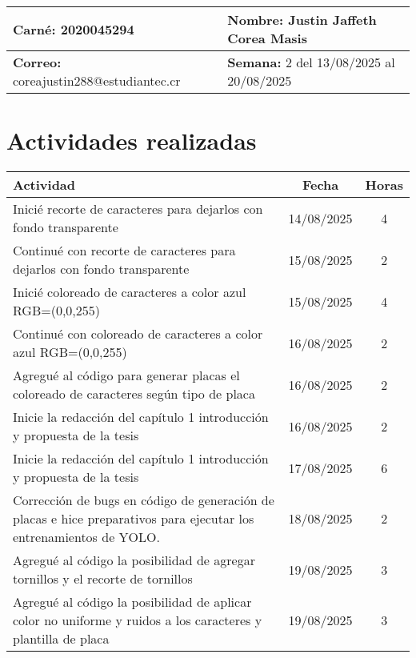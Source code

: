 \documentclass[12pt,a4paper]{article}
\begin{document}
\noindent
\begin{tabularx}{\textwidth}{|X|X|}
\hline
\textbf{Carné:} 2020045294 & \textbf{Nombre:} Justin Jaffeth Corea Masis \\
\hline
\textbf{Correo:} coreajustin288@estudiantec.cr & \textbf{Semana:} 2 del 13/08/2025 al 20/08/2025 \\
\hline
\end{tabularx}

\vspace{0.5cm}

\section*{Actividades realizadas}

\begin{tabularx}{\textwidth}{|>{\raggedright\arraybackslash}p{12cm}|c|c|}
\hline
\textbf{Actividad} & \textbf{Fecha} & \textbf{Horas} \\
\hline
Inicié recorte de caracteres para dejarlos con fondo transparente & 14/08/2025 & 4 \\
\hline
Continué con recorte de caracteres para dejarlos con fondo transparente& 15/08/2025 & 2 \\
\hline
Inicié coloreado de caracteres a color azul RGB=(0,0,255) & 15/08/2025 & 4 \\
\hline
Continué con coloreado de caracteres a color azul RGB=(0,0,255) & 16/08/2025 & 2 \\
\hline
Agregué al código para generar placas el coloreado de caracteres según tipo de placa & 16/08/2025 & 2 \\
\hline
Inicie la redacción del capítulo 1 introducción y propuesta de la tesis & 16/08/2025 & 2 \\
\hline
Inicie la redacción del capítulo 1 introducción y propuesta de la tesis & 17/08/2025 & 6 \\
\hline
Corrección de bugs en código de generación de placas e hice preparativos para ejecutar los entrenamientos
	de YOLO. & 18/08/2025 & 2 \\
\hline
Agregué al código la posibilidad de agregar tornillos y el recorte de tornillos & 19/08/2025 & 3 \\
\hline 
Agregué al código la posibilidad de aplicar color no uniforme y ruidos a los caracteres y plantilla de placa & 19/08/2025 & 3 \\
\hline 
\end{tabularx}
\end{document}
